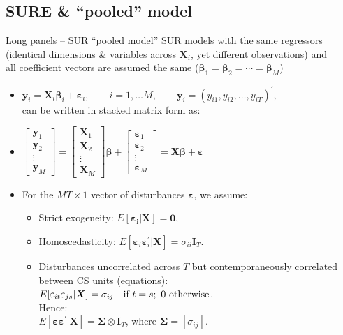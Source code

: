 \documentclass[usenames,dvipsnames]{beamer}
\begin{document}
\subsection*{SURE \& ``pooled'' model}
\begin{frame}{Long panels -- SUR ``pooled model''}
\small
SUR models with the same regressors (identical dimensions \& variables across $\bm{X}_i$, yet different observations) and \\
all coefficient vectors are assumed the same ($\bm{\beta}_1=\bm{\beta}_2=\cdots=\bm{\beta}_M$)\\
\begin{itemize}
    \item $\bm{y}_i = \bm{X}_i \bm{\beta}_i + \bm{\varepsilon}_i,\qquad i = 1,\dots M,\qquad \bm{y}_i = (y_{i1},y_{i2},\dots,y_{iT})^{\prime}, $\\ \smallskip 
    can be written in stacked matrix form as:
    \medskip
    \item $\begin{bmatrix}
    \bm{y}_1 \\ \bm{y}_2 \\ \vdots \\ \bm{y}_M
    \end{bmatrix} = 
    \begin{bmatrix} 
    \bm{X}_1 \\ \bm{X}_2 \\ \vdots \\ \bm{X}_M 
    \end{bmatrix} \bm{\beta} + 
    \begin{bmatrix}
    \bm{\varepsilon}_1 \\ \bm{\varepsilon}_2 \\ \vdots \\ \bm{\varepsilon}_M
    \end{bmatrix} = \bm{X\beta}+\bm{\varepsilon}$
    \medskip
    \item For the $MT \times 1$ vector of disturbances $\bm{\varepsilon}$, we assume:
    \begin{itemize}
        \item Strict exogeneity: $E[\bm{\varepsilon_i}|\bm{X}]=\bm{0}$,
        \item Homoscedasticity: $E[\bm{\varepsilon}_i \bm{\varepsilon}_i^{\prime} |\bm{X}]=\sigma_{ii}\bm{I}_T$.
        \item Disturbances uncorrelated across $T$ but contemporaneously correlated between CS units (equations):\\
        $E[\varepsilon_{it} \varepsilon_{js} |\bm{X}]=\sigma_{ij}~~~\textnormal{if}~t=s;~0~\textnormal{otherwise}$.\\ Hence:\\
        $E[\bm{\varepsilon} \bm{\varepsilon}^{\prime} |\bm{X}] = \bm{\Sigma} \otimes \bm{I}_T$, \quad where $\bm{\Sigma} = [\sigma_{ij}]$.
    \end{itemize}
\end{itemize}
\end{frame}
\end{document}
